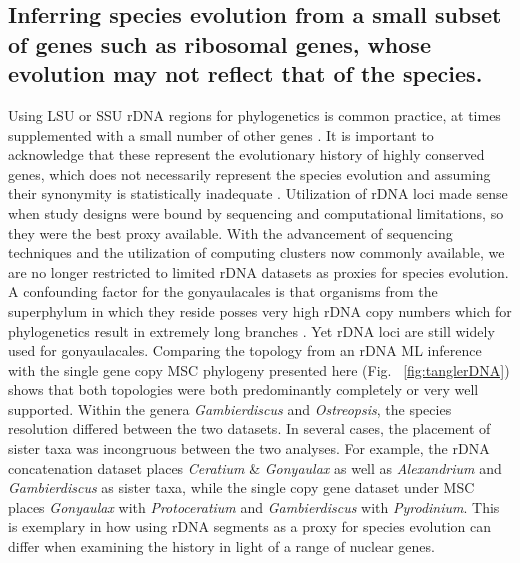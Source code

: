 \documentclass[12pt]{article}
\begin{document}
\subsection*{Inferring species evolution from a small subset of genes such as ribosomal genes, whose evolution may not reflect that of the species.}
\FloatBarrier 
Using LSU or SSU rDNA regions for phylogenetics is common practice, at times supplemented with a small number of other genes \cite{shalchian2006combined,zhang2007three,saldarriaga2004molecular,murray2005improving,hoppenrath2010dinoflagellate}. 
It is important to acknowledge that these represent the evolutionary history of highly conserved genes, which does not necessarily represent the species evolution and assuming their synonymity is statistically inadequate \cite{degnan2009gene}.
Utilization of rDNA loci made sense when study designs were bound by sequencing and computational limitations, so they were the best proxy available. 
With the advancement of sequencing techniques and the utilization of computing clusters now commonly available, we are no longer restricted to limited rDNA datasets as proxies for species evolution. 
A confounding factor for the gonyaulacales is that organisms from the superphylum in which they reside posses very high rDNA copy numbers which for phylogenetics result in extremely long branches \cite{he2016reducing}. 
Yet rDNA loci are still widely used for gonyaulacales. 
Comparing the topology from an rDNA ML inference with the single gene copy MSC phylogeny presented here (Fig. ~\ref{fig:tanglerDNA}) shows that both topologies were both predominantly completely or very well supported. 
Within the genera \emph{Gambierdiscus} and \emph{Ostreopsis}, the species resolution differed between the two datasets. 
In several cases, the placement of sister taxa was incongruous between the two analyses. 
For example, the rDNA concatenation dataset places \emph{Ceratium} \& \emph{Gonyaulax} as well as \emph{Alexandrium} and \emph{Gambierdiscus} as sister taxa, while the single copy gene dataset under MSC places \emph{Gonyaulax} with \emph{Protoceratium} and \emph{Gambierdiscus} with \emph{Pyrodinium}. 
This is exemplary in how using rDNA segments as a proxy for species evolution can differ when examining the history in light of a range of nuclear genes. 
\end{document}

